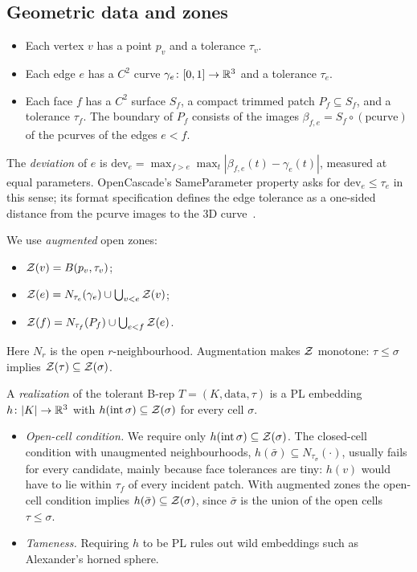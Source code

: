 \subsection{Geometric data and zones}
\begin{itemize}
\item Each vertex $v$ has a point $p_v$ and a tolerance $\tau_v$.
\item Each edge $e$ has a $C^2$ curve $\gamma_e\colon[0,1]\to\mathbb{R}^3$ and a tolerance $\tau_e$.
\item Each face $f$ has a $C^2$ surface $S_f$, a compact trimmed patch $P_f\subseteq S_f$, and a tolerance
$\tau_f$. The boundary of $P_f$ consists of the images $\beta_{f,e}=S_f\circ(\text{pcurve})$ of the pcurves of the
edges $e<f$.
\end{itemize}
The \emph{deviation} of $e$ is $\mathrm{dev}_e=\max_{f>e}\max_t|\beta_{f,e}(t)-\gamma_e(t)|$, measured at equal
parameters. OpenCascade's SameParameter property asks for $\mathrm{dev}_e\le\tau_e$ in this sense; its format
specification defines the edge tolerance as a one-sided distance from the pcurve images to the 3D
curve~\cite{OCCT}.

\begin{definition}[Zones]\label{def:zones}
We use \emph{augmented} open zones:
\begin{itemize}
\item $\mathcal{Z}(v)=B(p_v,\tau_v)$;
\item $\mathcal{Z}(e)=N_{\tau_e}(\gamma_e)\cup\bigcup_{v<e}\mathcal{Z}(v)$;
\item $\mathcal{Z}(f)=N_{\tau_f}(P_f)\cup\bigcup_{e<f}\mathcal{Z}(e)$.
\end{itemize}
Here $N_r$ is the open $r$-neighbourhood. Augmentation makes $\mathcal{Z}$ monotone: $\tau\le\sigma$ implies
$\mathcal{Z}(\tau)\subseteq\mathcal{Z}(\sigma)$.
\end{definition}

\begin{definition}[Realization]\label{def:realization}
A \emph{realization} of the tolerant B-rep $T=(K,\text{data},\tau)$ is a PL embedding $h\colon|K|\to\mathbb{R}^3$ with
$h(\operatorname{int}\sigma)\subseteq\mathcal{Z}(\sigma)$ for every cell $\sigma$.
\end{definition}

\begin{remark}\label{rem:opencell}
\begin{itemize}
\item \emph{Open-cell condition.} We require only $h(\operatorname{int}\sigma)\subseteq\mathcal{Z}(\sigma)$. The closed-cell
condition with unaugmented neighbourhoods, $h(\bar\sigma)\subseteq N_{\tau_\sigma}(\cdot)$, usually fails for every
candidate, mainly because face tolerances are tiny: $h(v)$ would have to lie within $\tau_f$ of every incident patch. With augmented zones the open-cell
condition implies $h(\bar\sigma)\subseteq\mathcal{Z}(\sigma)$, since $\bar\sigma$ is the union of the open cells
$\tau\le\sigma$.
\item \emph{Tameness.} Requiring $h$ to be PL rules out wild embeddings such as Alexander's horned sphere.
\end{itemize}
\end{remark}

